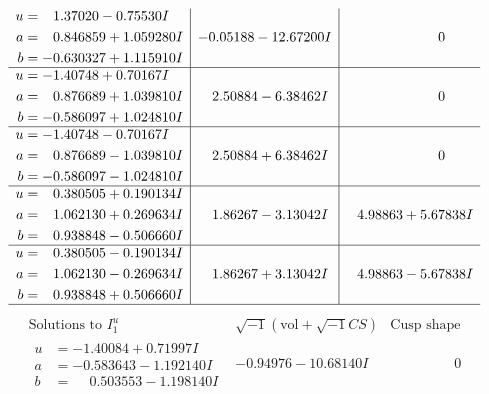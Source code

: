 \documentclass[1p]{elsarticle_modified}
\theoremstyle{definition}
\newcommand{\I}{\sqrt{-1}}
\begin{document}
$$\begin{array}{c|c|c}
\begin{aligned}
u &= \phantom{-}1.37020 - 0.75530 I \\
a &= \phantom{-}0.846859 + 1.059280 I \\
b &= -0.630327 + 1.115910 I\end{aligned}
 & -0.05188 - 12.67200 I & \phantom{-0.000000 } 0 \\ \hline\begin{aligned}
u &= -1.40748 + 0.70167 I \\
a &= \phantom{-}0.876689 + 1.039810 I \\
b &= -0.586097 + 1.024810 I\end{aligned}
 & \phantom{-}2.50884 - 6.38462 I & \phantom{-0.000000 } 0 \\ \hline\begin{aligned}
u &= -1.40748 - 0.70167 I \\
a &= \phantom{-}0.876689 - 1.039810 I \\
b &= -0.586097 - 1.024810 I\end{aligned}
 & \phantom{-}2.50884 + 6.38462 I & \phantom{-0.000000 } 0 \\ \hline\begin{aligned}
u &= \phantom{-}0.380505 + 0.190134 I \\
a &= \phantom{-}1.062130 + 0.269634 I \\
b &= \phantom{-}0.938848 - 0.506660 I\end{aligned}
 & \phantom{-}1.86267 - 3.13042 I & \phantom{-}4.98863 + 5.67838 I \\ \hline\begin{aligned}
u &= \phantom{-}0.380505 - 0.190134 I \\
a &= \phantom{-}1.062130 - 0.269634 I \\
b &= \phantom{-}0.938848 + 0.506660 I\end{aligned}
 & \phantom{-}1.86267 + 3.13042 I & \phantom{-}4.98863 - 5.67838 I\\
 \hline 
 \end{array}$$\newpage$$\begin{array}{c|c|c}  
\text{Solutions to }I^u_{1}& \I (\text{vol} + \sqrt{-1}CS) & \text{Cusp shape}\\
 \hline 
\begin{aligned}
u &= -1.40084 + 0.71997 I \\
a &= -0.583643 - 1.192140 I \\
b &= \phantom{-}0.503553 - 1.198140 I\end{aligned}
 & -0.94976 - 10.68140 I & \phantom{-0.000000 } 0 \\ \hline\begin{aligned}

\end{aligned}
\end{array}$$
\end{document}
